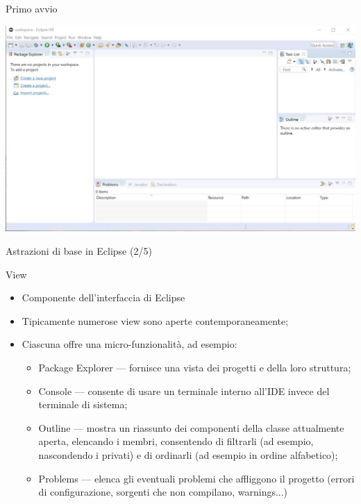 \documentclass[presentation]{beamer}
\begin{document}
\begin{frame}{Primo avvio}
\begin{center}
\includegraphics[width=\textwidth]{img/eclipse-screenshots/eclipse-ide-01.jpg}
\end{center}
\end{frame}

\begin{frame}{Astrazioni di base in Eclipse (2/5)}
\begin{block}{View}
\begin{itemize}
\item Componente dell'interfaccia di Eclipse
\item Tipicamente numerose view sono aperte contemporaneamente;
\item Ciascuna offre una micro-funzionalità, ad esempio:
\begin{itemize}
\item Package Explorer --- fornisce una vista dei progetti e della loro struttura;
\item Console --- consente di usare un terminale interno all'IDE invece del terminale di sistema;
\item Outline --- mostra un riassunto dei componenti della classe attualmente aperta, elencando i membri, consentendo di filtrarli (ad esempio, nascondendo i privati) e di ordinarli (ad esempio in ordine alfabetico);
\item Problems --- elenca gli eventuali problemi che affliggono il progetto (errori di configurazione, sorgenti che non compilano, warnings...)
\end{itemize}
\end{itemize}
\end{block}
\end{frame}
\end{document}
